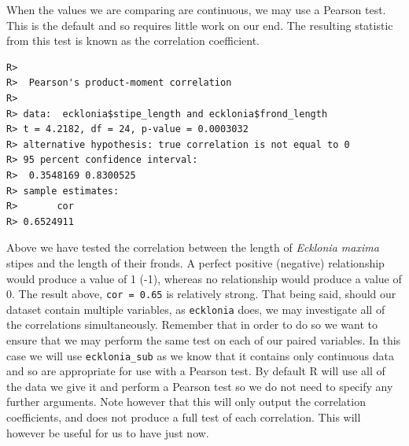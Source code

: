 \documentclass[english,10pt,a4paper,oneside]{book}
\newenvironment{Shaded}{\begin{snugshade}}{\end{snugshade}}
\newcommand{\KeywordTok}[1]{\textcolor[rgb]{0.13,0.29,0.53}{\textbf{#1}}}
\newcommand{\DataTypeTok}[1]{\textcolor[rgb]{0.13,0.29,0.53}{#1}}
\newcommand{\StringTok}[1]{\textcolor[rgb]{0.31,0.60,0.02}{#1}}
\newcommand{\CommentTok}[1]{\textcolor[rgb]{0.56,0.35,0.01}{\textit{#1}}}
\newcommand{\OperatorTok}[1]{\textcolor[rgb]{0.81,0.36,0.00}{\textbf{#1}}}
\newcommand{\NormalTok}[1]{#1}
\theoremstyle{definition}
\theoremstyle{definition}
\theoremstyle{definition}
\theoremstyle{remark}
\begin{document}
When the values we are comparing are continuous, we may use a Pearson
test. This is the default and so requires little work on our end. The
resulting statistic from this test is known as the correlation
coefficient.

\begin{Shaded}
\end{Shaded}

\begin{verbatim}
R> 
R>  Pearson's product-moment correlation
R> 
R> data:  ecklonia$stipe_length and ecklonia$frond_length
R> t = 4.2182, df = 24, p-value = 0.0003032
R> alternative hypothesis: true correlation is not equal to 0
R> 95 percent confidence interval:
R>  0.3548169 0.8300525
R> sample estimates:
R>       cor 
R> 0.6524911
\end{verbatim}

Above we have tested the correlation between the length of
\emph{Ecklonia maxima} stipes and the length of their fronds. A perfect
positive (negative) relationship would produce a value of 1 (-1),
whereas no relationship would produce a value of 0. The result above,
\texttt{cor\ =\ 0.65} is relatively strong. That being said, should our
dataset contain multiple variables, as \texttt{ecklonia} does, we may
investigate all of the correlations simultaneously. Remember that in
order to do so we want to ensure that we may perform the same test on
each of our paired variables. In this case we will use
\texttt{ecklonia\_sub} as we know that it contains only continuous data
and so are appropriate for use with a Pearson test. By default R will
use all of the data we give it and perform a Pearson test so we do not
need to specify any further arguments. Note however that this will only
output the correlation coefficients, and does not produce a full test of
each correlation. This will however be useful for us to have just now.
\end{document}
